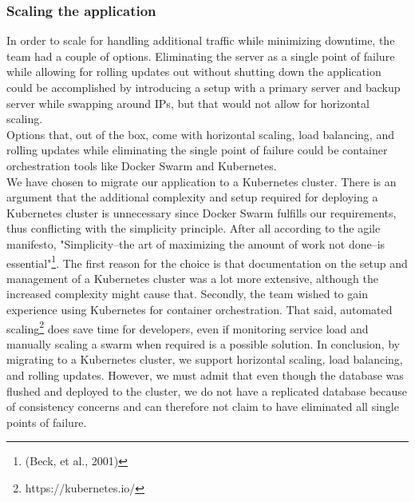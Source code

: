 \subsubsection{Scaling the application}
\label{subsubsec:scalingApp}
In order to scale for handling additional traffic while minimizing downtime, the team had a couple of options. Eliminating the server as a single point of failure while allowing for rolling updates out without shutting down the application could be accomplished by introducing a setup with a primary server and backup server while swapping around IPs, but that would not allow for horizontal scaling.\\
Options that, out of the box, come with horizontal scaling, load balancing, and rolling updates while eliminating the single point of failure could be container orchestration tools like Docker Swarm and Kubernetes.\\ 
We have chosen to migrate our application to a Kubernetes cluster. There is an argument that the additional complexity and setup required for deploying a Kubernetes cluster is unnecessary since Docker Swarm fulfills our requirements, thus conflicting with the simplicity principle. After all according to the agile manifesto, "Simplicity--the art of maximizing the amount
of work not done--is essential"\footnote{(Beck, et al., 2001)\cite{beck2001agile}}. The first reason for the choice is that documentation on the setup and management of a Kubernetes cluster was a lot more extensive, although the increased complexity might cause that. Secondly, the team wished to gain experience using Kubernetes for container orchestration. That said, automated scaling\footnote{https://kubernetes.io/} does save time for developers, even if monitoring service load and manually scaling a swarm when required is a possible solution. In conclusion, by migrating to a Kubernetes cluster, we support horizontal scaling, load balancing, and rolling updates. However, we must admit that even though the database was flushed and deployed to the cluster, we do not have a replicated database because of consistency concerns and can therefore not claim to have eliminated all single points of failure.
